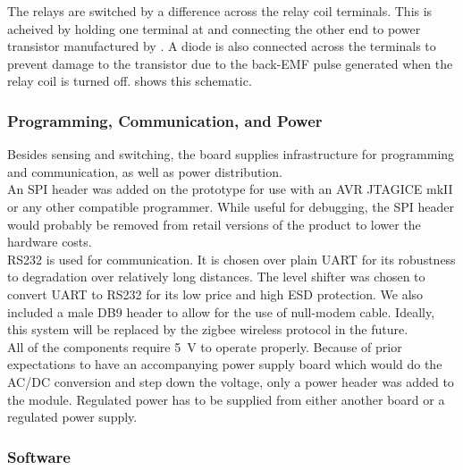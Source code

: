 The relays are switched by a \vddval difference across the relay coil terminals. This is acheived by holding one terminal at \vdd and connecting the other end to \transistor power transistor manufactured by \transistormf. A diode is also connected across the terminals to prevent damage to the transistor due to the back-EMF pulse generated when the relay coil is turned off.  shows this schematic. \\

\subsubsection{Programming, Communication, and Power}
Besides sensing and switching, the board supplies infrastructure for programming and communication, as well as power distribution.
\\An SPI header was added on the prototype for use with an AVR JTAGICE mkII or any other compatible programmer. While useful for debugging, the SPI header would probably be removed from retail versions of the product to lower the hardware costs.
\\RS232 is used for communication. It is chosen over plain UART for its robustness to degradation over relatively long distances. The \shiftr level shifter was chosen to convert UART to RS232 for its low price and high ESD protection. We also included a male DB9 header to allow for the use of null-modem cable. Ideally, this system will be replaced by the zigbee wireless protocol in the future.
\\All of the components require \SI{5}{\volt} to operate properly. Because of prior expectations to have an accompanying power supply board which would do the AC/DC conversion and step down the voltage, only a power header was added to the \atmel module. Regulated power has to be supplied from either another board or a regulated power supply.

\subsubsection{Software}

